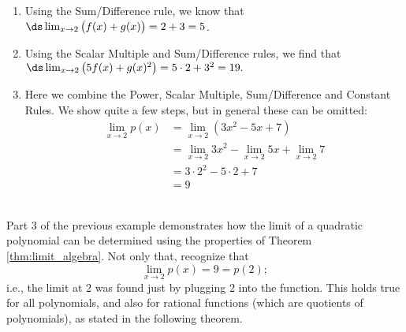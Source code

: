 {\begin{enumerate}
\item		Using the Sum/Difference rule, we know that $\ds \lim_{x\to 2} \big(f(x) + g(x)\big) = 2+3 =5$.
\item		Using the Scalar Multiple and Sum/Difference rules, we find that $\ds \lim_{x\to 2} \big(5f(x) + g(x)^2\big) = 5\cdot 2 + 3^2 = 19.$
\item		Here we combine the Power, Scalar Multiple, Sum/Difference and Constant Rules. We show quite a few steps, but in general these can be omitted:
				\begin{align*}
				\lim_{x\to 2} p(x) &= \lim_{x\to 2} (3x^2-5x+7) \\
				&= \lim_{x\to 2} 3x^2-\lim_{x\to 2} 5x+\lim_{x\to 2}7 \\
				 &= 3\cdot 2^2 - 5\cdot 2+7 \\
				 &= 9
				\end{align*}
\end{enumerate}
\baselineskip
}\\

Part 3 of the previous example demonstrates how the limit of a quadratic polynomial can be determined using the properties of Theorem \ref{thm:limit_algebra}. Not only that, recognize that $$\lim_{x\to 2} p(x) = 9 = p(2);$$ i.e., the limit at 2 was found just by plugging 2 into the function. This holds true for all polynomials, and also for rational functions (which are quotients of polynomials), as stated in the following theorem.

